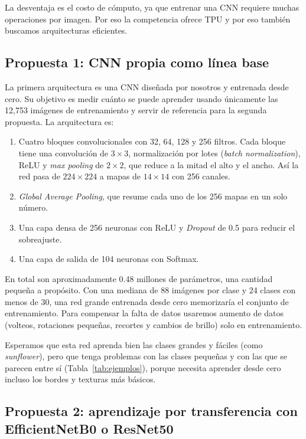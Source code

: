 La desventaja es el costo de cómputo, ya que entrenar una CNN requiere muchas operaciones por imagen. Por eso la competencia ofrece TPU y por eso también buscamos arquitecturas eficientes.

\subsection{Propuesta 1: CNN propia como línea base}

La primera arquitectura es una CNN diseñada por nosotros y entrenada desde cero. Su objetivo es medir cuánto se puede aprender usando únicamente las 12,753 imágenes de entrenamiento y servir de referencia para la segunda propuesta. La arquitectura es:

\begin{enumerate}
    \item Cuatro bloques convolucionales con 32, 64, 128 y 256 filtros. Cada bloque tiene una convolución de $3\times3$, normalización por lotes (\textit{batch normalization}), ReLU y \textit{max pooling} de $2\times2$, que reduce a la mitad el alto y el ancho. Así la red pasa de $224\times224$ a mapas de $14\times14$ con 256 canales.
    \item \textit{Global Average Pooling}, que resume cada uno de los 256 mapas en un solo número.
    \item Una capa densa de 256 neuronas con ReLU y \textit{Dropout} de 0.5 para reducir el sobreajuste.
    \item Una capa de salida de 104 neuronas con Softmax.
\end{enumerate}

En total son aproximadamente 0.48 millones de parámetros, una cantidad pequeña a propósito. Con una mediana de 88 imágenes por clase y 24 clases con menos de 30, una red grande entrenada desde cero memorizaría el conjunto de entrenamiento. Para compensar la falta de datos usaremos aumento de datos (volteos, rotaciones pequeñas, recortes y cambios de brillo) solo en entrenamiento.

Esperamos que esta red aprenda bien las clases grandes y fáciles (como \textit{sunflower}), pero que tenga problemas con las clases pequeñas y con las que se parecen entre sí (Tabla~\ref{tab:ejemplos}), porque necesita aprender desde cero incluso los bordes y texturas más básicos.

\subsection{Propuesta 2: aprendizaje por transferencia con EfficientNetB0 o ResNet50}

